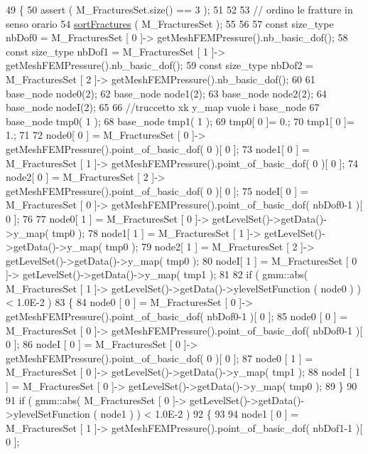 \begin{DoxyCode}
49 \{   
50     assert ( M\_FracturesSet.size() == 3 );
51     
52 
53     \textcolor{comment}{// ordino le fratture in senso orario}
54     \hyperlink{classIntersection_ab3bd72c81dc261d3035213e5cefbb1c5}{sortFractures} ( M\_FracturesSet );
55 
56     
57     \textcolor{keyword}{const} size\_type nbDof0 =  M\_FracturesSet [ 0 ]-> getMeshFEMPressure().nb\_basic\_dof();
58     \textcolor{keyword}{const} size\_type nbDof1 =  M\_FracturesSet [ 1 ]-> getMeshFEMPressure().nb\_basic\_dof();
59     \textcolor{keyword}{const} size\_type nbDof2 =  M\_FracturesSet [ 2 ]-> getMeshFEMPressure().nb\_basic\_dof();
60     
61     base\_node node0(2);
62     base\_node node1(2);
63     base\_node node2(2);
64     base\_node nodeI(2);
65     
66     \textcolor{comment}{//truccetto xk y\_map vuole i base\_node}
67     base\_node tmp0( 1 );
68     base\_node tmp1( 1 );
69     tmp0[ 0 ]= 0.;
70     tmp1[ 0 ]= 1.;
71     
72     node0[ 0 ] = M\_FracturesSet [ 0 ]-> getMeshFEMPressure().point\_of\_basic\_dof( 0 )[ 0 ];
73     node1[ 0 ] = M\_FracturesSet [ 1 ]-> getMeshFEMPressure().point\_of\_basic\_dof( 0 )[ 0 ];
74     node2[ 0 ] = M\_FracturesSet [ 2 ]-> getMeshFEMPressure().point\_of\_basic\_dof( 0 )[ 0 ];
75     nodeI[ 0 ] = M\_FracturesSet [ 0 ]-> getMeshFEMPressure().point\_of\_basic\_dof( nbDof0-1 )[ 0 ];
76     
77     node0[ 1 ] = M\_FracturesSet [ 0 ]-> getLevelSet()->getData()->y\_map( tmp0 );
78     node1[ 1 ] = M\_FracturesSet [ 1 ]-> getLevelSet()->getData()->y\_map( tmp0 );
79     node2[ 1 ] = M\_FracturesSet [ 2 ]-> getLevelSet()->getData()->y\_map( tmp0 );
80     nodeI[ 1 ] = M\_FracturesSet [ 0 ]-> getLevelSet()->getData()->y\_map( tmp1 );
81     
82     \textcolor{keywordflow}{if} ( gmm::abs( M\_FracturesSet [ 1 ]-> getLevelSet()->getData()->ylevelSetFunction ( node0 ) ) < 1.0E-2 
      )
83     \{
84         node0 [ 0 ] = M\_FracturesSet [ 0 ]-> getMeshFEMPressure().point\_of\_basic\_dof( nbDof0-1 )[ 0 ];
85         node0 [ 0 ] = M\_FracturesSet [ 0 ]-> getMeshFEMPressure().point\_of\_basic\_dof( nbDof0-1 )[ 0 ];
86         nodeI [ 0 ] = M\_FracturesSet [ 0 ]-> getMeshFEMPressure().point\_of\_basic\_dof( 0 )[ 0 ];
87         node0 [ 1 ] = M\_FracturesSet [ 0 ]-> getLevelSet()->getData()->y\_map( tmp1 );
88         nodeI [ 1 ] = M\_FracturesSet [ 0 ]-> getLevelSet()->getData()->y\_map( tmp0 );
89     \}
90 
91     \textcolor{keywordflow}{if} ( gmm::abs( M\_FracturesSet [ 0 ]-> getLevelSet()->getData()->ylevelSetFunction ( node1 ) ) < 1.0E-2 
      )
92     \{
93         
94         node1 [ 0 ] = M\_FracturesSet [ 1 ]-> getMeshFEMPressure().point\_of\_basic\_dof( nbDof1-1 )[ 0 ];

\end{DoxyCode}
